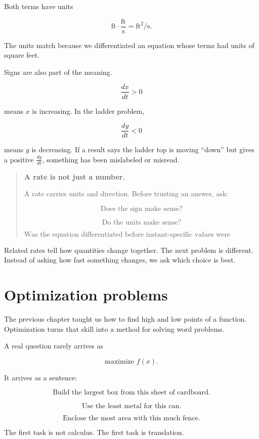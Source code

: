 Both terms have units

\[
\text{ft}\cdot\frac{\text{ft}}{\text{s}}
=
\text{ft}^2/\text{s}.
\]

The units match because we differentiated an equation whose terms had units of square
feet.

Signs are also part of the meaning.

\[
\frac{dx}{dt}>0
\]

means \(x\) is increasing.  In the ladder problem,

\[
\frac{dy}{dt}<0
\]

means \(y\) is decreasing.  If a result says the ladder top is moving ``down'' but gives
a positive \(\frac{dy}{dt}\), something has been mislabeled or misread.

\begin{quote}
\textbf{A rate is not just a number.}

A rate carries units and direction.  Before trusting an answer, ask:

\[
\text{Does the sign make sense?}
\]

\[
\text{Do the units make sense?}
\]

\[
\text{Was the equation differentiated before instant-specific values were substituted?}
\]
\end{quote}

Related rates tell how quantities change together.  The next problem is different.  Instead
of asking how fast something changes, we ask which choice is best.

\section{Optimization problems}
\label{sec:optimization-problems}

The previous chapter taught us how to find high and low points of a function.  Optimization
turns that skill into a method for solving word problems.

A real question rarely arrives as

\[
\text{maximize } f(x).
\]

It arrives as a sentence:

\[
\text{Build the largest box from this sheet of cardboard.}
\]

\[
\text{Use the least metal for this can.}
\]

\[
\text{Enclose the most area with this much fence.}
\]

The first task is not calculus.  The first task is translation.


